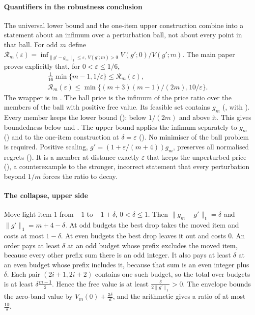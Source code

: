 
\paragraph{Quantifiers in the robustness conclusion}
The universal lower bound and the one-item upper construction combine into a statement about
an infimum over a perturbation ball, not about every point in that ball. For odd $m$ define
$\mathcal R_m(\varepsilon)=\inf_{\|g'-g_m\|_1\le\varepsilon,\ V(g';m)>0}
V(g';0)/V(g';m)$. The main paper proves explicitly that, for $0<\varepsilon\le1/6$,
\begin{gather*}
\frac1{16}\min\{m-1,1/\varepsilon\}\le\mathcal R_m(\varepsilon),\\
\mathcal R_m(\varepsilon)\le\min\{(m+3)(m-1)/(2m),10/\varepsilon\}.
\end{gather*}
The wrapper is  in . The ball price
 is the infimum of the price ratio over the members of the ball with positive
free value. Its feasible set contains $g_m$ (, with ).
Every member keeps the lower bound ():
 below $1/(2m)$ and  above it. This gives
boundedness below and . The upper bound  applies the
infimum separately to $g_m$ () and to the one-item construction at
$\delta=\varepsilon$ (). No minimiser of the ball problem is required.
Positive scaling, $g'=(1+\varepsilon/(m+4))g_m$, preserves all normalised regrets
(). It is a member at distance exactly $\varepsilon$ that keeps the
unperturbed price (), a counterexample to the stronger, incorrect
statement that every perturbation beyond $1/m$ forces the ratio to decay.

\paragraph{The collapse, upper side} Move light item $1$ from $-1$ to $-1+\delta$,
$0<\delta\le1$. Then $\|g_{m}-g'\|_{1}=\delta$ and $\|g'\|_{1}=m+4-\delta$. At odd budgets
the best drop takes the moved item and costs at most $1-\delta$. At even budgets the best
drop leaves it out and costs $0$. An order pays at least $\delta$ at an odd budget whose
prefix excludes the moved item, because every other prefix sum there is an odd integer. It
also pays at least $\delta$ at an even budget whose prefix includes it, because that sum is an
even integer plus $\delta$. Each pair $(2i+1,2i+2)$ contains one such budget, so the total
over budgets is at least $\delta\frac{m-1}{2}$. Hence the free value is at least
$\frac{\delta}{2\|g'\|_{1}}>0$. The envelope bounds the zero-band value by
$V_{m}(0)+\frac{3\delta}{d}$, and the arithmetic gives a ratio of at most
$\frac{10}{\delta}$.

